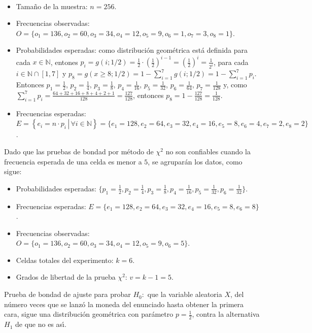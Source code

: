 \begin{solucion}
 \begin{datos}
  $\phantom{0}$
  \begin{itemize}
   \item Tama\~no de la muestra: $n=256$.
   \item Frecuencias observadas:
   $O = \{o_1=136, o_2=60, o_3=34, o_4=12, o_5=9, o_6=1, o_7=3, o_8=1\}$.
   \item Probabilidades esperadas: como distribuci\'on geom\'etrica
   est\'a definida para cada $x\in\mathbb{N}$, entones $p_i = g(i;1/2) =
   \frac{1}{2} \cdot \left( \frac{1}{2} \right)^{i-1} = 
   \left( \frac{1}{2} \right)^{i} = \frac{1}{2^i}$,
   para cada $i \in \mathbb{N}\cap[1,7]$
   y $p_8 = g(x\geq 8; 1/2) = 1 - \sum_{i=1}^{7} g(i;1/2)
   = 1 - \sum_{i=1}^{7} p_i$.
   Entonces $p_1 = \frac{1}{2}$, $p_2 = \frac{1}{4}$, $p_3 = \frac{1}{8}$,
   $p_4 = \frac{1}{16}$, $p_5 = \frac{1}{32}$, $p_6 = \frac{1}{64}$,
   $p_7 = \frac{1}{128}$
   y, como $\sum_{i=1}^7 p_i=\frac{64+32+16+8+4+2+1}{128}=\frac{127}{128}$, entonces $p_8 = 1 - \frac{127}{128} = \frac{1}{128}$.
   \item Frecuencias esperadas: $E = \left\{
   \left.e_i=n\cdot p_i\,\right|\,\forall i\in\mathbb{N} \right\}
   = \{e_1=128, e_2=64, e_3=32, e_4=16, e_5=8, e_6=4, e_7=2, e_8=2\}$.
  \end{itemize}
  Dado que las pruebas de bondad por m\'etodo de $\chi^2$ no son confiables
  cuando la frecuencia esperada de una celda es menor a $5$,
  se agrupar\'an los datos, como sigue:
  \begin{itemize}
   \item Probabilidades esperadas:
   $\{ p_1 = \frac{1}{2}, p_2 = \frac{1}{4}, p_3 = \frac{1}{8},
   p_4 = \frac{1}{16}, p_5 = \frac{1}{32}, p_6 = \frac{1}{32} \}$.
   \item Frecuencias esperadas:
   $E=\{e_1 = 128, e_2 = 64, e_3 = 32, e_4 = 16, e_5 = 8, e_6 = 8\}$.
   \item Frecuencias observadas:
   $O = \{o_1=136, o_2=60, o_3=34, o_4=12, o_5=9, o_6=5\}$.
   \item Celdas totales del experimento: $k=6$.
   \item Grados de libertad de la prueba $\chi^2$: $v= k-1 = 5$.
  \end{itemize}
 \end{datos}

 \begin{hipotesis}
  Prueba de bondad de ajuste para probar $H_0:$
  que la variable aleatoria $X$, del n\'umero veces
  que se lanz\'o la moneda del enunciado hasta obtener la primera cara,
  sigue una distribuci\'on geom\'etrica
  con par\'ametro $p=\frac{1}{2}$,
  contra la alternativa $H_1$ de que no es as\'{\i}.
 \end{hipotesis}


\end{solucion}
